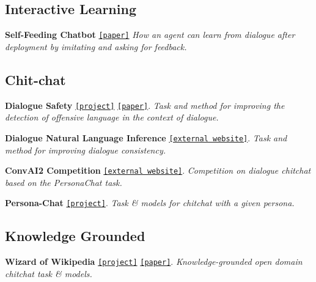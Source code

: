 \subsection*{Interactive Learning}


\begin{DoxyItemize}
\item {\bfseries Self-\/\+Feeding Chatbot} \href{https://arxiv.org/abs/1901.05415}{\tt \mbox{[}paper\mbox{]}} {\itshape How an agent can learn from dialogue after deployment by imitating and asking for feedback.}
\end{DoxyItemize}

\subsection*{Chit-\/chat}


\begin{DoxyItemize}
\item {\bfseries Dialogue Safety} \href{https://parl.ai/projects/dialogue_safety/}{\tt \mbox{[}project\mbox{]}} \href{https://arxiv.org/abs/1908.06083}{\tt \mbox{[}paper\mbox{]}}. {\itshape Task and method for improving the detection of offensive language in the context of dialogue.}
\item {\bfseries Dialogue Natural Language Inference} \href{https://wellecks.github.io/dialogue_nli/}{\tt \mbox{[}external website\mbox{]}}. {\itshape Task and method for improving dialogue consistency.}
\item {\bfseries Conv\+A\+I2 Competition} \href{http://convai.io/}{\tt \mbox{[}external website\mbox{]}}. {\itshape Competition on dialogue chitchat based on the Persona\+Chat task.}
\item {\bfseries Persona-\/\+Chat} \href{https://github.com/facebookresearch/ParlAI/tree/master/projects/personachat}{\tt \mbox{[}project\mbox{]}}. {\itshape Task \& models for chitchat with a given persona.}
\end{DoxyItemize}

\subsection*{Knowledge Grounded}


\begin{DoxyItemize}
\item {\bfseries Wizard of Wikipedia} \href{http://parl.ai/projects/wizard_of_wikipedia/}{\tt \mbox{[}project\mbox{]}} \href{https://openreview.net/forum?id=r1l73iRqKm}{\tt \mbox{[}paper\mbox{]}}. {\itshape Knowledge-\/grounded open domain chitchat task \& models.}
\end{DoxyItemize}

